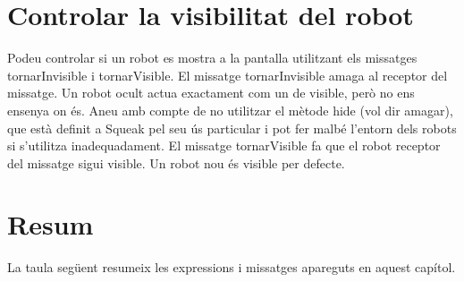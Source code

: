 \section{Controlar la visibilitat del robot}
Podeu controlar si un robot es mostra a la pantalla utilitzant els missatges \textsf{tornarInvisible} i \textsf{tornarVisible}. El missatge \textsf{tornarInvisible} amaga al receptor del missatge. Un robot ocult actua exactament com un de visible, però no ens ensenya on és. Aneu amb compte de no utilitzar el mètode \textsf{hide} (vol dir amagar), que està definit a Squeak pel seu ús particular i pot fer malbé l'entorn dels robots si s'utilitza inadequadament. El missatge \textsf{tornarVisible} fa que el robot receptor del missatge sigui visible. Un robot nou és visible per defecte. 

\newpage

\section{Resum}
 
La taula següent resumeix les expressions i missatges apareguts en aquest capítol.
  

\vspace*{5mm}

